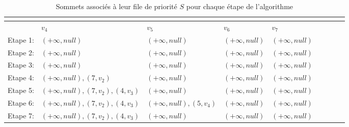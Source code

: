 \begin{exemple}
\begin{table}[]
\begin{tabular}{l|l|l|l|l|l|l|l|l|}
\multicolumn{1}{|l|}{}  		&  &    &    &      \\ \hline
\multicolumn{1}{|l|}{}         & $v_{4}$ &$v_{5}$  & $v_{6}$ &$v_{7}$  \\ \hline
\multicolumn{1}{|l|}{Etape 1:} & $(+\infty,null)$   &$(+\infty,null)$     &$(+\infty,null)$    &$(+\infty,null)$    \\ \hline
\multicolumn{1}{|l|}{Etape 2:} &$(+\infty,null)$    &$(+\infty,null)$    &$(+\infty,null)$    &$(+\infty,null)$    \\ \hline
\multicolumn{1}{|l|}{Etape 3:} &$(+\infty,null)$    &$(+\infty,null)$    &$(+\infty,null)$    &$(+\infty,null)$    \\ \hline
\multicolumn{1}{|l|}{Etape 4:} &$(+\infty,null),(7,v_{2})$    &$(+\infty,null)$    &$(+\infty,null)$    &$(+\infty,null)$    \\ \hline
\multicolumn{1}{|l|}{Etape 5:} &$(+\infty,null),(7,v_{2}),(4,v_{3})$    &$(+\infty,null)$    &$(+\infty,null)$    &$(+\infty,null)$    \\ \hline
\multicolumn{1}{|l|}{Etape 6:} &$(+\infty,null),(7,v_{2}),(4,v_{3})$     &$(+\infty,null),(5,v_{4})$    &$(+\infty,null)$    &$(+\infty,null)$    \\ \hline
\multicolumn{1}{|l|}{Etape 7:} &$(+\infty,null),(7,v_{2}),(4,v_{3})$     &$(+\infty,null)$    &$(+\infty,null)$    &$(+\infty,null)$    \\ \hline

\end{tabular}
\caption{Sommets associés à leur file de priorité $S$ pour chaque étape de l'algorithme}
\label{tab:filePrior}



\end{table}
	
\end{exemple}	 

\clearpage